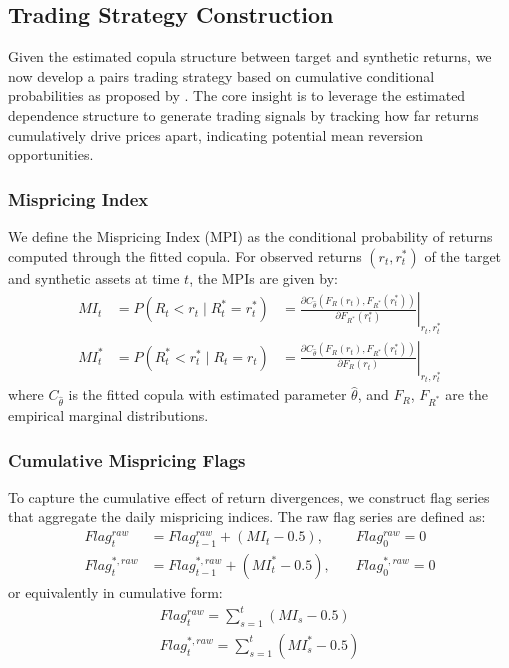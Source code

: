\subsection{Trading Strategy Construction}

Given the estimated copula structure between target and synthetic returns, we now develop a pairs trading strategy based on cumulative conditional probabilities as proposed by \cite{xie2016}. The core insight is to leverage the estimated dependence structure to generate trading signals by tracking how far returns cumulatively drive prices apart, indicating potential mean reversion opportunities.

\subsubsection{Mispricing Index}

We define the Mispricing Index (MPI) as the conditional probability of returns computed through the fitted copula. For observed returns $(r_t, r_t^*)$ of the target and synthetic assets at time $t$, the MPIs are given by:
%
\begin{equation*}
\begin{array}{lll}
MI_t &= P(R_t < r_t \mid R_t^* = r_t^*) &= \left.\frac{\partial C_{\hat{\theta}}(F_R(r_t), F_{R^*}(r_t^*))}{\partial F_{R^*}(r_t^*)}\right|_{r_t,r_t^*}
\\[1em]
MI_t^* &= P(R_t^* < r_t^* \mid R_t = r_t) &= \left.\frac{\partial C_{\hat{\theta}}(F_R(r_t), F_{R^*}(r_t^*))}{\partial F_R(r_t)}\right|_{r_t,r_t^*}
\end{array}
\end{equation*}
%
where $C_{\hat{\theta}}$ is the fitted copula with estimated parameter $\hat{\theta}$, and $F_R$, $F_{R^*}$ are the empirical marginal distributions.

\subsubsection{Cumulative Mispricing Flags}

To capture the cumulative effect of return divergences, we construct flag series that aggregate the daily mispricing indices. The raw flag series are defined as:
%
\begin{equation*}
\begin{array}{lll}
Flag_t^{raw} &= Flag_{t-1}^{raw} + (MI_t - 0.5), &\quad Flag_0^{raw} = 0
\\[0.5em]
Flag_t^{*,raw} &= Flag_{t-1}^{*,raw} + (MI_t^* - 0.5), &\quad Flag_0^{*,raw} = 0
\end{array}
\end{equation*}
%
or equivalently in cumulative form:
%
\begin{equation*}
\begin{array}{ll}
Flag_t^{raw} = \sum_{s=1}^t (MI_s - 0.5)
\\[0.5em]
Flag_t^{*,raw} = \sum_{s=1}^t (MI_s^* - 0.5)
\end{array}
\end{equation*}

